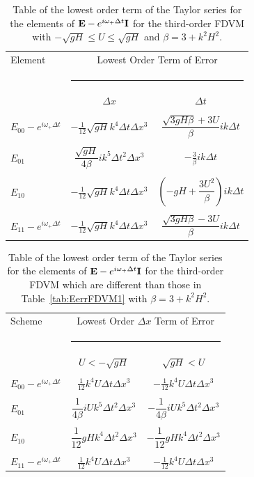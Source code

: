 \begin{table}
	\begin{tabular}{l  c c}
		Element & \multicolumn{2}{c}{Lowest Order Term of Error}\\
		&  \multicolumn{2}{l}{\rule{0.7\textwidth}{0.4pt}} \\
		& $\Delta x$&$\Delta t$\\
		\hline && \\
		$E_{00} -  e^{i \omega_+ \Delta t} $& $ - \frac{1}{12} \sqrt{gH} k^4 \Delta t\Delta x^3$ & $\dfrac{\sqrt{3gH \beta} + 3U}{\beta} ik \Delta t$ \\ & & \\
		$E_{01}$& $ \dfrac{\sqrt{gH}}{4 \beta}i k^5\Delta  t ^2\Delta x^3$ &  $ - \frac{3}{\beta} ik\Delta t$ \\ & & \\
		$E_{10}$& $ - \frac{1}{12} \sqrt{gH} k^4 \Delta t\Delta x^3$ &  $ \left(-gH + \dfrac{3U^2}{\beta}\right)ik \Delta t$ \\ & & \\
		$E_{11} -  e^{i \omega_+ \Delta t}$& $ - \frac{1}{12} \sqrt{gH} k^4 \Delta t\Delta x^3$ & $\dfrac{\sqrt{3gH \beta} - 3U}{\beta} ik \Delta t$ \\ 
	\end{tabular}
	\caption{Table of the lowest order term of the Taylor series for the elements of $\mathbf{E} - e^{i \omega_+ \Delta t} \mathbf{I}$ for the third-order FDVM with $ -\sqrt{gH} \le U \le \sqrt{gH}$ and $\beta = 3 + k^2 H^2$.}
	\label{tab:EerrFDVM3} 
\end{table}

\begin{table}
	\begin{tabular}{l  c  c}
		Scheme &\multicolumn{2}{c}{Lowest Order $\Delta x$ Term of Error}\\
		&  \multicolumn{2}{l}{\rule{0.7\textwidth}{0.4pt}} \\
		& $U < - \sqrt{gH}$&$ \sqrt{gH} < U$\\
		\hline & \\
		$E_{00} -  e^{i \omega_+ \Delta t} $& $\frac{1}{12} k^4 U \Delta t \Delta x^3$ &  $ -\frac{1}{12} k^4 U \Delta t \Delta x^3$ \\  &  \\
		$E_{01}$& $\dfrac{1}{4 \beta}iUk^5 \Delta t^2 \Delta x^3 $ & $-\dfrac{1}{4 \beta}iUk^5 \Delta t^2 \Delta x^3 $   \\  &  \\
		$E_{10}$& $\dfrac{1}{12} gHk^4 \Delta t^2 \Delta x^3 $ & $-\dfrac{1}{12} gHk^4 \Delta t^2 \Delta x^3 $  \\  &  \\
		$E_{11} -  e^{i \omega_+ \Delta t}$& $ \frac{1}{12} k^4 U \Delta t \Delta x^3$ & $ -\frac{1}{12} k^4 U \Delta t \Delta x^3$   \\
	\end{tabular}
	\caption{Table of the lowest order term of the Taylor series for the elements of $\mathbf{E} - e^{i \omega_+ \Delta t} \mathbf{I}$ for the third-order FDVM which are different than those in Table~\ref{tab:EerrFDVM1} with  $\beta = 3 + k^2 H^2$. }
	\label{tab:EerrFDVM3super} 
\end{table}

